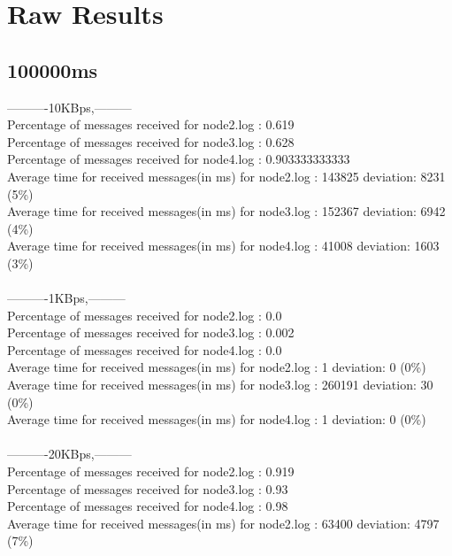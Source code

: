 \section {Raw Results} \label{RawResults}
    \subsection{100000ms}\label{RawResults:100000ms}
        ----------10KBps,---------\\
        Percentage of messages received for node2.log : 0.619\\
        Percentage of messages received for node3.log : 0.628\\
        Percentage of messages received for node4.log : 0.903333333333\\
        Average time for received messages(in ms) for  node2.log : 143825 	deviation: 8231 (5\%)\\
        Average time for received messages(in ms) for  node3.log : 152367 	deviation: 6942 (4\%)\\
        Average time for received messages(in ms) for  node4.log : 41008 	deviation: 1603 (3\%)\\\\
        ----------1KBps,---------\\
        Percentage of messages received for node2.log : 0.0\\
        Percentage of messages received for node3.log : 0.002\\
        Percentage of messages received for node4.log : 0.0\\
        Average time for received messages(in ms) for  node2.log : 1 	deviation: 0 (0\%)\\
        Average time for received messages(in ms) for  node3.log : 260191 	deviation: 30 (0\%)\\
        Average time for received messages(in ms) for  node4.log : 1 	deviation: 0 (0\%)\\\\
        ----------20KBps,---------\\
        Percentage of messages received for node2.log : 0.919\\
        Percentage of messages received for node3.log : 0.93\\
        Percentage of messages received for node4.log : 0.98\\
        Average time for received messages(in ms) for  node2.log : 63400 	deviation: 4797 (7\%)\\
